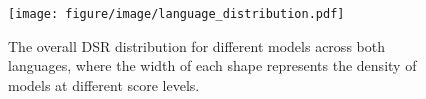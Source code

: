 \begin{figure}[htbp]
    \centering
    \texttt{[image: figure/image/language\_distribution.pdf]}
    \caption{The overall DSR distribution for different models across both languages, where the width of each shape represents the density of models  at different score levels.}
    \label{fig:llm_ch_en_violin}
\end{figure}

